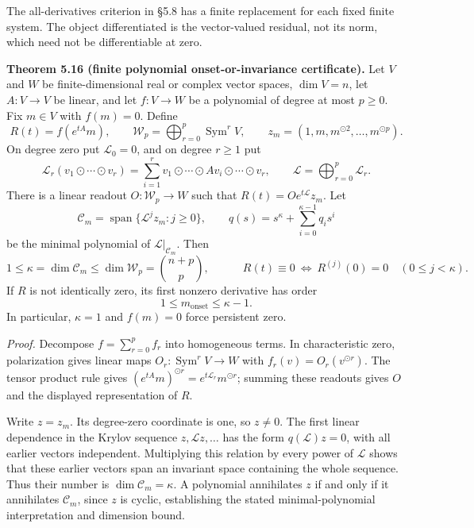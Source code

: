 \documentclass[
  11pt,
]{article}
\begin{document}
The all-derivatives criterion in §5.8 has a finite replacement for each fixed
finite system. The object differentiated is the vector-valued residual, not
its norm, which need not be differentiable at zero.

\textbf{Theorem 5.16 (finite polynomial onset-or-invariance certificate).} Let \(V\)
and \(W\) be finite-dimensional real or complex vector spaces, \(\dim V=n\), let
\(A:V\to V\) be linear, and let \(f:V\to W\) be a polynomial of degree at most
\(p\geq0\). Fix \(m\in V\) with \(f(m)=0\). Define
\[
 R(t)=f(e^{tA}m),\qquad
 \mathcal W_p=\bigoplus_{r=0}^{p}\operatorname{Sym}^{r}V,
 \qquad z_m=(1,m,m^{\odot2},\ldots,m^{\odot p}).
\]
On degree zero put \(\mathcal L_0=0\), and on degree \(r\geq1\) put
\[
 \mathcal L_r(v_1\odot\cdots\odot v_r)
 =\sum_{i=1}^{r}v_1\odot\cdots\odot Av_i\odot\cdots\odot v_r,
 \qquad \mathcal L=\bigoplus_{r=0}^{p}\mathcal L_r.
\]
There is a linear readout \(O:\mathcal W_p\to W\) such that
\(R(t)=Oe^{t\mathcal L}z_m\). Let
\[
 \mathcal C_m=\operatorname{span}\{\mathcal L^jz_m:j\geq0\},
 \qquad q(s)=s^\kappa+\sum_{i=0}^{\kappa-1}q_i s^i
\]
be the minimal polynomial of \(\mathcal L|_{\mathcal C_m}\). Then
\[
 1\leq\kappa=\dim\mathcal C_m
 \leq\dim\mathcal W_p={n+p\choose p},
 \qquad
 \boxed{\quad R(t)\equiv0\ \Longleftrightarrow\
          R^{(j)}(0)=0\quad(0\leq j<\kappa).\quad}
\]
If \(R\) is not identically zero, its first nonzero derivative has order
\[
 \boxed{\quad 1\leq m_{\mathrm{onset}}\leq\kappa-1.\quad}
\]
In particular, \(\kappa=1\) and \(f(m)=0\) force persistent zero.

\emph{Proof.} Decompose \(f=\sum_{r=0}^{p}f_r\) into homogeneous terms. In
characteristic zero, polarization gives linear maps
\(O_r:\operatorname{Sym}^rV\to W\) with \(f_r(v)=O_r(v^{\odot r})\).
The tensor product rule gives
\((e^{tA}m)^{\odot r}=e^{t\mathcal L_r}m^{\odot r}\); summing these
readouts gives \(O\) and the displayed representation of \(R\).

Write \(z=z_m\). Its degree-zero coordinate is one, so \(z\ne0\). The first
linear dependence in the Krylov sequence \(z,\mathcal Lz,\ldots\) has the
form \(q(\mathcal L)z=0\), with all earlier vectors independent. Multiplying
this relation by every power of \(\mathcal L\) shows that these earlier
vectors span an invariant space containing the whole sequence. Thus their
number is \(\dim\mathcal C_m=\kappa\). A polynomial annihilates \(z\) if and
only if it annihilates \(\mathcal C_m\), since \(z\) is cyclic, establishing the
stated minimal-polynomial interpretation and dimension bound.
\end{document}

